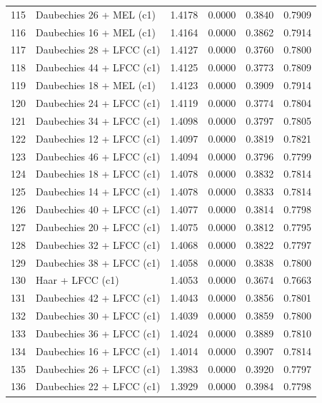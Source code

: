 \begin{longtable}{@{}rlrrrr@{}}
115 & Daubechies 26 + MEL (c1) & 1.4178 & 0.0000 & 0.3840 & 0.7909 \\
116 & Daubechies 16 + MEL (c1) & 1.4164 & 0.0000 & 0.3862 & 0.7914 \\
117 & Daubechies 28 + LFCC (c1) & 1.4127 & 0.0000 & 0.3760 & 0.7800 \\
118 & Daubechies 44 + LFCC (c1) & 1.4125 & 0.0000 & 0.3773 & 0.7809 \\
119 & Daubechies 18 + MEL (c1) & 1.4123 & 0.0000 & 0.3909 & 0.7914 \\
120 & Daubechies 24 + LFCC (c1) & 1.4119 & 0.0000 & 0.3774 & 0.7804 \\
121 & Daubechies 34 + LFCC (c1) & 1.4098 & 0.0000 & 0.3797 & 0.7805 \\
122 & Daubechies 12 + LFCC (c1) & 1.4097 & 0.0000 & 0.3819 & 0.7821 \\
123 & Daubechies 46 + LFCC (c1) & 1.4094 & 0.0000 & 0.3796 & 0.7799 \\
124 & Daubechies 18 + LFCC (c1) & 1.4078 & 0.0000 & 0.3832 & 0.7814 \\
125 & Daubechies 14 + LFCC (c1) & 1.4078 & 0.0000 & 0.3833 & 0.7814 \\
126 & Daubechies 40 + LFCC (c1) & 1.4077 & 0.0000 & 0.3814 & 0.7798 \\
127 & Daubechies 20 + LFCC (c1) & 1.4075 & 0.0000 & 0.3812 & 0.7795 \\
128 & Daubechies 32 + LFCC (c1) & 1.4068 & 0.0000 & 0.3822 & 0.7797 \\
129 & Daubechies 38 + LFCC (c1) & 1.4058 & 0.0000 & 0.3838 & 0.7800 \\
130 & Haar + LFCC (c1) & 1.4053 & 0.0000 & 0.3674 & 0.7663 \\
131 & Daubechies 42 + LFCC (c1) & 1.4043 & 0.0000 & 0.3856 & 0.7801 \\
132 & Daubechies 30 + LFCC (c1) & 1.4039 & 0.0000 & 0.3859 & 0.7800 \\
133 & Daubechies 36 + LFCC (c1) & 1.4024 & 0.0000 & 0.3889 & 0.7810 \\
134 & Daubechies 16 + LFCC (c1) & 1.4014 & 0.0000 & 0.3907 & 0.7814 \\
135 & Daubechies 26 + LFCC (c1) & 1.3983 & 0.0000 & 0.3920 & 0.7797 \\
136 & Daubechies 22 + LFCC (c1) & 1.3929 & 0.0000 & 0.3984 & 0.7798 \\
\end{longtable}
